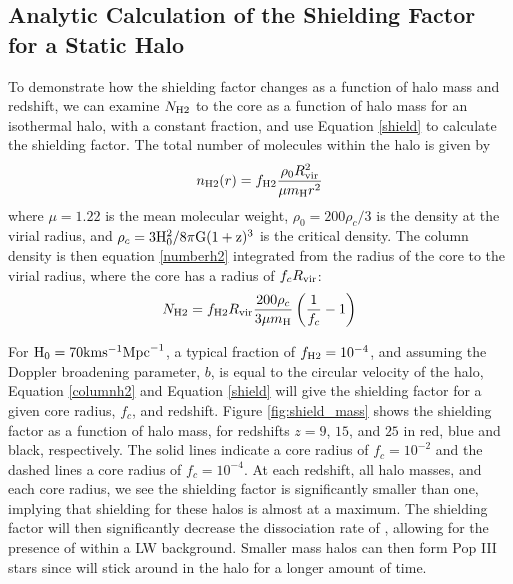 \documentclass[a4paper,fleqn,usenatbib]{mnras}
\begin{document}
\subsection{Analytic Calculation of the Shielding Factor for a Static Halo}
To demonstrate how the shielding factor changes as a function of halo mass and redshift, we can examine $N_{\rm H2}$ to the core as a function of halo mass for an isothermal halo, with a constant \hh{} fraction, and use Equation \ref{shield} to calculate the shielding factor. The total number of \hh{} molecules within the halo is given by 
\begin{equation} \label{numberh2}
	n_{\rm H2}(r) = f_{\rm H2} \frac{\rho_{0}R^{2}_{\rm vir}}{\mu m_{\rm H} r^{2}}
\end{equation}
where $\mu = 1.22$ is the mean molecular weight, $\rho_{0} = 200 \rho_{c} / 3$ is the density at the virial radius, and $\rho_{c} = 3 \rm{H}_{0}^{2} / 8 \pi \rm{G} (1+z)^3$ is the critical density. The column density is then equation \ref{numberh2} integrated from the radius of the core to the virial radius, where the core has a radius of $f_{c} R_{\rm vir}$: 
\begin{equation} \label{columnh2}
	N_{\rm H2} = f_{\rm H2} R_{\rm vir} \frac{200 \rho_{c}}{3 \mu m_{\rm H}} \left(\frac{1}{f_{c}} - 1 \right)
\end{equation}

For $\rm{H}_{0} = 70 \rm{km} \rm{s}^{-1} \rm{Mpc}^{-1}$, a typical \hh{} fraction of $f_{\rm H2} = 10^{-4}$, and assuming the Doppler broadening parameter, $b$, is equal to the circular velocity of the halo, Equation \ref{columnh2} and Equation \ref{shield} will give the shielding factor for a given core radius, $f_{c}$, and redshift. Figure \ref{fig:shield_mass} shows the shielding factor as a function of halo mass, for redshifts $z = 9$, $15$, and $25$ in red, blue and black, respectively. The solid lines indicate a core radius of $f_{c} = 10^{-2}$ and the dashed lines a core radius of $f_{c} = 10^{-4}$. At each redshift, all halo masses, and each core radius, we see the shielding factor is significantly smaller than one, implying that \hh{} shielding for these halos is almost at a maximum. The shielding factor will then significantly decrease the dissociation rate of \hh{}, allowing for the presence of \hh{} within a LW background. Smaller mass halos can then form Pop III stars since \hh{} will stick around in the halo for a longer amount of time. 
\end{document}
